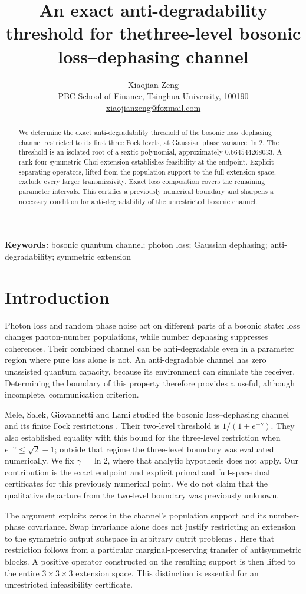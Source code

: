 \documentclass[11pt]{article}
\title{An exact anti-degradability threshold for the\newline three-level bosonic loss--dephasing channel}
\author{Xiaojian Zeng\\[3pt]
\small PBC School of Finance, Tsinghua University, 100190\\
\small \href{mailto:xiaojianzeng@foxmail.com}{xiaojianzeng@foxmail.com}}
\date{}
\begin{document}
\maketitle
\begin{abstract}
We determine the exact anti-degradability threshold of the bosonic
loss--dephasing channel restricted to its first three Fock levels, at Gaussian
phase variance $\ln 2$. The threshold is an isolated root of a sextic
polynomial, approximately $0.664544268033$. A rank-four symmetric Choi
extension establishes feasibility at the endpoint. Explicit separating
operators, lifted from the population support to the full extension space,
exclude every larger transmissivity. Exact loss composition covers the remaining
parameter intervals. This certifies a previously numerical boundary and
sharpens a necessary condition for anti-degradability of the unrestricted
bosonic channel.
\end{abstract}
\noindent\textbf{Keywords:} bosonic quantum channel; photon loss; Gaussian dephasing;
anti-degradability; symmetric extension

\section{Introduction}
Photon loss and random phase noise act on different parts of a bosonic state:
loss changes photon-number populations, while number dephasing suppresses
coherences. Their combined channel can be anti-degradable even in a parameter
region where pure loss alone is not. An anti-degradable channel has zero
unassisted quantum capacity, because its environment can simulate the receiver.
Determining the boundary of this property therefore provides a useful,
although incomplete, communication criterion.

Mele, Salek, Giovannetti and Lami studied the bosonic loss--dephasing channel
and its finite Fock restrictions \cite{Mele2024}. Their two-level threshold is
$1/(1+e^{-\gamma})$. They also established equality with this bound for the
three-level restriction when $e^{-\gamma}\leq\sqrt2-1$; outside that regime
the three-level boundary was evaluated numerically. We fix $\gamma=\ln2$,
where that analytic hypothesis does not apply. Our contribution is the exact
endpoint and explicit primal and full-space dual certificates for this
previously numerical point. We do not claim that the qualitative departure
from the two-level boundary was previously unknown.

The argument exploits zeros in the channel's population support and its
number-phase covariance. Swap invariance alone does not justify restricting
an extension to the symmetric output subspace in arbitrary qutrit problems
\cite{Myhr2009}. Here that restriction follows from a particular
marginal-preserving transfer of antisymmetric blocks. A positive operator
constructed on the resulting support is then lifted to the entire
$3\times3\times3$ extension space. This distinction is essential for an
unrestricted infeasibility certificate.
\end{document}
